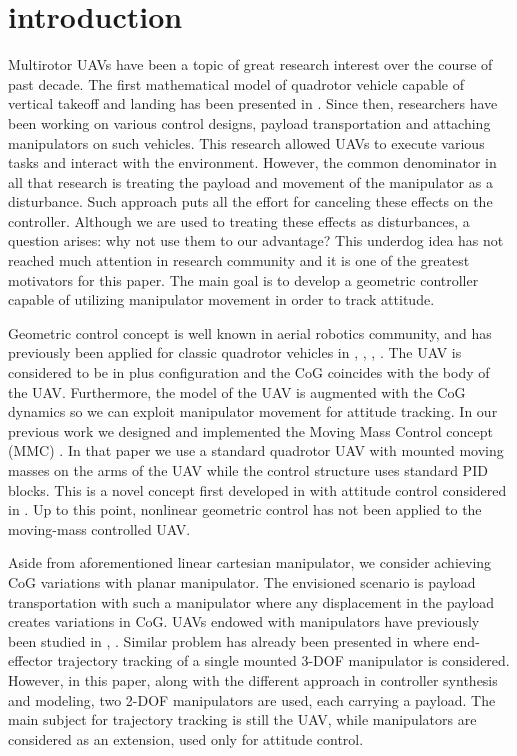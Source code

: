 \section{introduction}

Multirotor UAVs have been a topic of great research interest over the course of past decade. The first mathematical model of quadrotor vehicle capable of vertical takeoff and landing has been presented in \cite{hamel2002quad}. Since then, researchers have been working on various control designs, payload transportation and attaching manipulators on such vehicles. This research allowed UAVs to execute various tasks and interact with the environment. However, the common denominator in all that research is treating the payload and movement of the manipulator as a disturbance. Such approach puts all the effort for canceling these effects on the controller. Although we are used to treating these effects as disturbances, a question arises: why not use them to our advantage? This underdog idea has not reached much attention in research community and it is one of the greatest motivators for this paper. The main goal is to develop a geometric controller capable of utilizing manipulator movement in order to track attitude. 

Geometric control concept is well known in aerial robotics community, and has previously been applied for classic quadrotor vehicles in \cite{LeeClanak4}, \cite{LeeClanak3}, \cite{LeeClanak1}, \cite{Kumar}. The UAV is considered to be in plus configuration and the CoG coincides with the body of the UAV. Furthermore, the model of the UAV is augmented with the CoG dynamics so we can exploit manipulator movement for attitude tracking. In our previous work we designed and implemented the Moving Mass Control concept (MMC) \cite{movingMass1}. In that paper we use a standard quadrotor UAV with mounted moving masses on the arms of the UAV while the control structure uses standard PID blocks. This is a novel concept first developed in \cite{movingMass2} with attitude control considered in \cite{movingMass3}. Up to this point, nonlinear geometric control has not been applied to the moving-mass controlled UAV.

Aside from aforementioned linear cartesian manipulator, we consider achieving CoG variations with planar manipulator. The envisioned scenario is payload transportation with such a manipulator where any displacement in the payload creates variations in CoG. UAVs endowed with manipulators have previously been studied in \cite{manipulator1}, \cite{manipulator2}. Similar problem has already been presented in \cite{manipulator3} where end-effector trajectory tracking of a single mounted 3-DOF manipulator is considered. However, in this paper, along with the different approach in controller synthesis and modeling, two 2-DOF manipulators are used, each carrying a payload. The main subject for trajectory tracking is still the UAV, while manipulators are considered as an extension, used only for attitude control.

